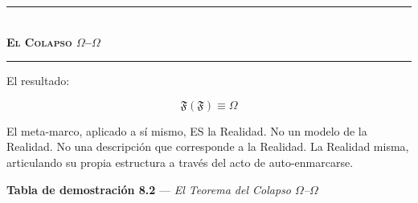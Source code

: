 \documentclass[10pt, openany, oneside]{book}
\renewcommand{\normalsize}{\fontsize{10}{13}\selectfont}
\begin{document}
\vspace{1.5em}


\begin{center}
    \rule{0.3\textwidth}{0.4pt}\\[0.5em]
    {\normalsize\bfseries\scshape El Colapso $\Omega$--$\Omega$}\\[0.3em]
    \rule{0.3\textwidth}{0.4pt}
\end{center}

\vspace{1em}

\noindent El resultado:

$$\boxed{\mathfrak{F}(\mathfrak{F}) \equiv \Omega}$$

El meta-marco, aplicado a sí mismo, ES la Realidad. No un modelo de la Realidad. No una descripción que corresponde a la Realidad. La Realidad misma, articulando su propia estructura a través del acto de auto-enmarcarse.

\vspace{0.5em}

\textbf{Tabla de demostración 8.2} --- \textit{El Teorema del Colapso $\Omega$--$\Omega$}

\vspace{0.5em}
\end{document}
